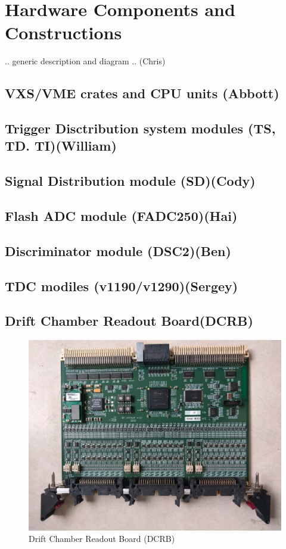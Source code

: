 \section{Hardware Components and Constructions}

.. generic description and diagram .. (Chris)

\subsection{VXS/VME crates and CPU units (Abbott)}

\subsection{Trigger Disctribution system modules (TS, TD. TI)(William)}
	
\subsection{Signal Distribution module (SD)(Cody)}

\subsection{Flash ADC module (FADC250)(Hai)}

\subsection{Discriminator module (DSC2)(Ben)}

\subsection{TDC modiles (v1190/v1290)(Sergey)}

\subsection{Drift Chamber Readout Board(DCRB)}

\begin{figure}[hbt]
	\centering
	\includegraphics[width=1.0\columnwidth,keepaspectratio]{img/dcrb_board.png}
	\caption{Drift Chamber Readout Board (DCRB)}
	\label{fig:dcrb_board}
\end{figure}

